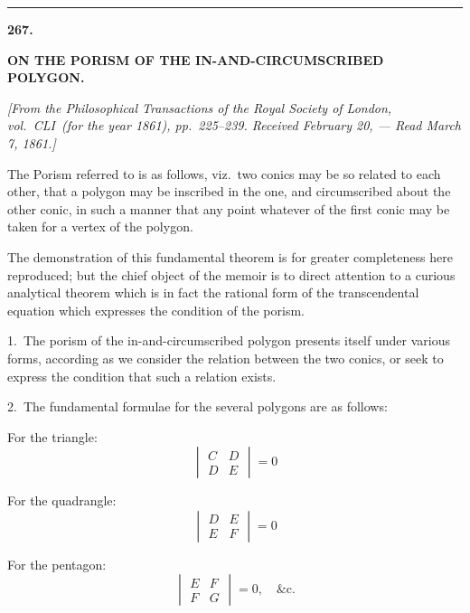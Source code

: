 \documentclass[11pt,a4paper]{book}
\begin{document}
\bigskip
\begin{center}
\rule{0.5\textwidth}{0.4pt}
\end{center}


\newpage
\setcounter{page}{310}
\begin{center}
\textbf{267.}\par
\smallskip
\textbf{ON THE PORISM OF THE IN-AND-CIRCUMSCRIBED POLYGON.}\par
\smallskip
\textit{[From the \textit{Philosophical Transactions} of the Royal Society of London, vol.~CLI\ (for the year 1861), pp.~225--239. Received February 20, --- Read March 7, 1861.]}
\end{center}

\smallskip

The Porism referred to is as follows, viz.\ two conics may be so related to each other, that a polygon may be inscribed in the one, and circumscribed about the other conic, in such a manner that any point whatever of the first conic may be taken for a vertex of the polygon.

The demonstration of this fundamental theorem is for greater completeness here reproduced; but the chief object of the memoir is to direct attention to a curious analytical theorem which is in fact the rational form of the transcendental equation which expresses the condition of the porism.

1.\ The porism of the in-and-circumscribed polygon presents itself under various forms, according as we consider the relation between the two conics, or seek to express the condition that such a relation exists.

2.\ The fundamental formulae for the several polygons are as follows:

For the triangle:
\[
\begin{vmatrix}
C & D \\
D & E
\end{vmatrix} = 0
\]

For the quadrangle:
\[
\begin{vmatrix}
D & E \\
E & F
\end{vmatrix} = 0
\]

For the pentagon:
\[
\begin{vmatrix}
E & F \\
F & G
\end{vmatrix} = 0,\quad \text{\&c.}
\]
\end{document}
